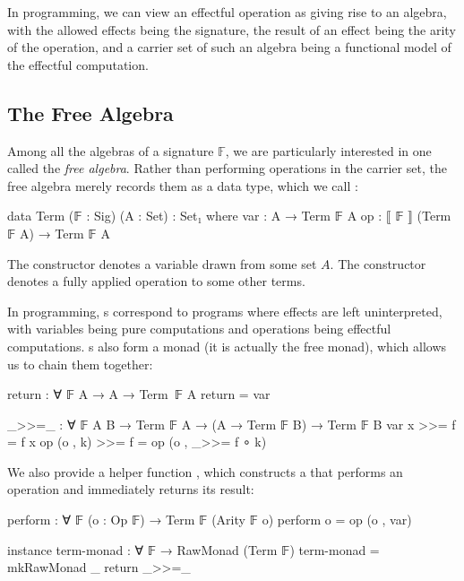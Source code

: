 In programming, we can view an effectful operation as giving rise to an algebra, with the allowed effects being the signature, the result of an effect being the arity of the operation, and a carrier set of such an algebra being a functional model of the effectful computation.

\subsection{The Free Algebra}

Among all the algebras of a signature $\mathbb{F}$, we are particularly interested in one called the \emph{free algebra}.
%
Rather than performing operations in the carrier set, the free algebra merely records them as a data type, which we call :
%
\begin{center}\begin{code}
data Term (𝔽 : Sig) (A : Set) : Set₁ where
  var : A → Term 𝔽 A
  op : ⟦ 𝔽 ⟧ (Term 𝔽 A) → Term 𝔽 A
\end{code}\end{center}
%
The  constructor denotes a variable drawn from some set $A$.
%
The  constructor denotes a fully applied operation to some other terms.

In programming, s correspond to programs where effects are left uninterpreted, with variables being pure computations and operations being effectful computations.
%
s also form a monad (it is actually the free monad), which allows us to chain them together:
%
\begin{center}\begin{code}
return : ∀ {𝔽} {A} → A → Term 𝔽 A
return = var

_>>=_ : ∀ {𝔽} {A B} → Term 𝔽 A → (A → Term 𝔽 B) → Term 𝔽 B
var x       >>= f =  f x
op (o , k)  >>= f =  op (o , _>>= f ∘ k)
\end{code}\end{center}
%
We also provide a helper function , which constructs a  that performs an operation and immediately returns its result:
%
\begin{center}\begin{code}
perform : ∀ {𝔽} (o : Op 𝔽) → Term 𝔽 (Arity 𝔽 o)
perform o = op (o , var)
\end{code}\end{center}

\begin{code}[hide]
instance
  term-monad : ∀ {𝔽} → RawMonad (Term 𝔽)
  term-monad = mkRawMonad _ return _>>=_
\end{code}

